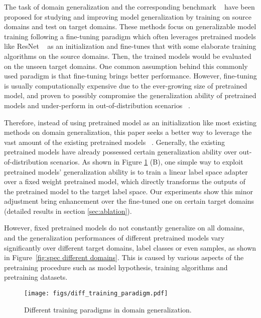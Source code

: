\documentclass{article}
\begin{document}
The task of domain generalization and the corresponding benchmark ~\citep{gulrajani2020search} have been proposed for studying and improving model generalization by training on source domains and test on target domains.
These methods focus on generalizable model training following a fine-tuning paradigm which often leverages pretrained models like ResNet ~\citep{he2016deep} as an initialization and fine-tunes that with some elaborate training algorithms on the source domains. 
Then, the trained models would be evaluated on the unseen target domains.
One common assumption behind this commonly used paradigm is that fine-tuning brings better performance.
However, fine-tuning is usually computationally expensive due to the ever-growing size of pretrained model, and proven to possibly compromise the generalization ability of pretrained models and under-perform in out-of-distribution scenarios ~\citep{kumar2021fine,yu2021empirical}.


Therefore, instead of using pretrained model as an initialization like most existing methods on domain generalization, this paper seeks a better way to leverage the vast amount of the existing pretrained models ~\citep{he2016deep,krizhevsky2012imagenet,iandola2014densenet,zoph2018learning,he2021masked,radford2021learning}. 
Generally, the existing pretrained models have already possessed certain generalization ability over out-of-distribution scenarios. 
As shown in Figure \ref{fig:training_paradigm} (B), one simple way to exploit pretrained models' generalization ability is to train a linear label space adapter over a fixed weight pretrained model, which directly transforms the outputs of the pretrained model to the target label space.
Our experiments show this minor adjustment bring enhancement over the fine-tuned one on certain target domains (detailed results in section \ref{sec:ablation}).

However, fixed pretrained models do not constantly generalize on all domains, and the generalization performances of different pretrained models vary significantly over different target domains, label classes or even samples, as shown in Figure~\ref{fig:spec different domains}.
This is caused by various aspects of the pretraining procedure such as model hypothesis, training algorithms and pretraining datasets.

\begin{figure}[t]
    \begin{center}
    \texttt{[image: figs/diff\_training\_paradigm.pdf]}
  \end{center}

  \caption{Different training paradigms in domain generalization.
}
  \label{fig:training_paradigm}

\end{figure}
\end{document}
